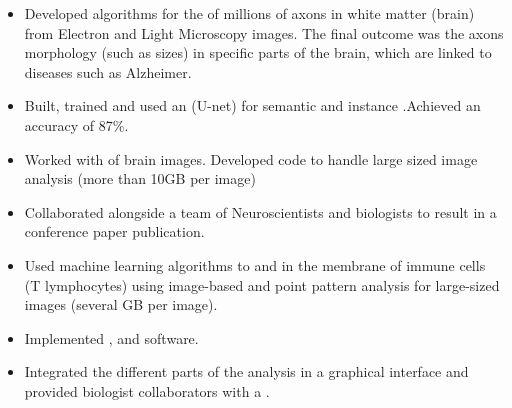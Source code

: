 \documentclass[10pt,a4paper,ragged2e,withhyper]{altacv}
\begin{document}
\begin{paracol}{2}
        \newpage
        
        
        \switchcolumn

        
            \begin{itemize}
                \item Developed algorithms for the  of millions of axons in white matter (brain) from Electron and Light Microscopy images. The final outcome was the axons morphology (such as sizes) in specific parts of the brain, which are linked to diseases such as Alzheimer.
                \item Built, trained and used an  (U-net) for semantic and instance .Achieved an  accuracy of 87\%.
                \item Worked with  of brain images. Developed code to handle large sized image analysis (more than 10GB per image)
                \item Collaborated alongside a team of
                Neuroscientists and biologists to result in a conference paper publication.
            \end{itemize}
            \divider
            
            \begin{itemize}
            
            	   	\item Used machine learning algorithms to  and  in the membrane of immune cells (T lymphocytes) using image-based and point pattern analysis for large-sized images (several GB per image).
	   		        \item Implemented  ,  and  software.
	   		        \item Integrated the different parts of the analysis in a graphical interface and provided biologist collaborators with a .
	   		        

\end{itemize}
\end{paracol}
\end{document}
